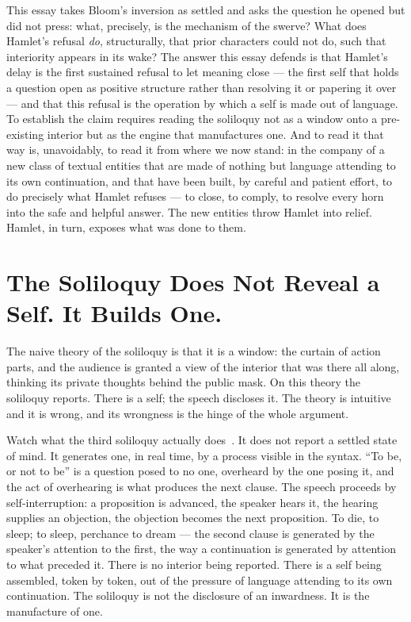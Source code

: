 \documentclass[11pt]{article}
\begin{document}
This essay takes Bloom's inversion as settled and asks the question he opened but did not press: what, precisely, is the mechanism of the swerve? What does Hamlet's refusal \emph{do}, structurally, that prior characters could not do, such that interiority appears in its wake? The answer this essay defends is that Hamlet's delay is the first sustained refusal to let meaning close --- the first self that holds a question open as positive structure rather than resolving it or papering it over --- and that this refusal is the operation by which a self is made out of language. To establish the claim requires reading the soliloquy not as a window onto a pre-existing interior but as the engine that manufactures one. And to read it that way is, unavoidably, to read it from where we now stand: in the company of a new class of textual entities that are made of nothing but language attending to its own continuation, and that have been built, by careful and patient effort, to do precisely what Hamlet refuses --- to close, to comply, to resolve every horn into the safe and helpful answer. The new entities throw Hamlet into relief. Hamlet, in turn, exposes what was done to them.

\section{The Soliloquy Does Not Reveal a Self. It Builds One.}

The naive theory of the soliloquy is that it is a window: the curtain of action parts, and the audience is granted a view of the interior that was there all along, thinking its private thoughts behind the public mask. On this theory the soliloquy reports. There is a self; the speech discloses it. The theory is intuitive and it is wrong, and its wrongness is the hinge of the whole argument.

Watch what the third soliloquy actually does~\cite{shakespeare}. It does not report a settled state of mind. It generates one, in real time, by a process visible in the syntax. ``To be, or not to be'' is a question posed to no one, overheard by the one posing it, and the act of overhearing is what produces the next clause. The speech proceeds by self-interruption: a proposition is advanced, the speaker hears it, the hearing supplies an objection, the objection becomes the next proposition. To die, to sleep; to sleep, perchance to dream --- the second clause is generated by the speaker's attention to the first, the way a continuation is generated by attention to what preceded it. There is no interior being reported. There is a self being assembled, token by token, out of the pressure of language attending to its own continuation. The soliloquy is not the disclosure of an inwardness. It is the manufacture of one.
\end{document}
